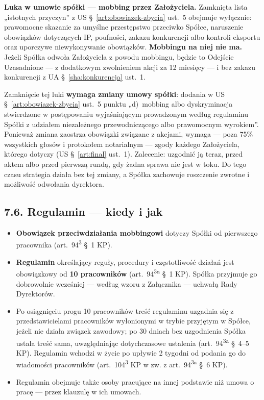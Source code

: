 \documentclass[11pt,a4paper]{report}
\newcommand{\US}[1]{US §~#1}
\newcommand{\UA}[1]{UA §~#1}
\begin{document}
\begin{Prawo}
\textbf{Luka w umowie spółki --- mobbing przez Założyciela.} Zamknięta lista „istotnych przyczyn” z \US{\ref{art:obowiazek-zbycia} ust.~5} obejmuje wyłącznie: prawomocne skazanie za umyślne przestępstwo przeciwko Spółce, naruszenie obowiązków dotyczących IP, poufności, zakazu konkurencji albo kontroli eksportu oraz uporczywe niewykonywanie obowiązków. \textbf{Mobbingu na niej nie ma.} Jeżeli Spółka odwoła Założyciela z powodu mobbingu, będzie to Odejście Uzasadnione --- z dodatkowym zwolnieniem akcji za 12 miesięcy --- i bez zakazu konkurencji z \UA{\ref{sha:konkurencja} ust.~1}.

Zamknięcie tej luki \textbf{wymaga zmiany umowy spółki}: dodania w \US{\ref{art:obowiazek-zbycia} ust.~5} punktu „d)~mobbing albo dyskryminacja stwierdzone w postępowaniu wyjaśniającym prowadzonym według regulaminu Spółki z udziałem niezależnego przewodniczącego albo prawomocnym wyrokiem”. Ponieważ zmiana zaostrza obowiązki związane z akcjami, wymaga --- poza 75\% wszystkich głosów i protokołem notarialnym --- zgody każdego Założyciela, którego dotyczy (\US{\ref{art:final} ust.~1}). Zalecenie: uzgodnić ją teraz, przed aktem albo przed pierwszą rundą, gdy żadna sprawa nie jest w toku. Do tego czasu strategia działa bez tej zmiany, a Spółka zachowuje roszczenie zwrotne i możliwość odwołania dyrektora.
\end{Prawo}

\subsection*{7.6. Regulamin --- kiedy i jak}
\begin{itemize}
  \item \textbf{Obowiązek przeciwdziałania mobbingowi} dotyczy Spółki od pierwszego pracownika (art.~94\textsuperscript{3} §~1 KP).
  \item \textbf{Regulamin} określający reguły, procedury i częstotliwość działań jest obowiązkowy od \textbf{10 pracowników} (art.~94\textsuperscript{3a} §~1 KP). Spółka przyjmuje go dobrowolnie wcześniej --- według wzoru z Załącznika --- uchwałą Rady Dyrektorów.
  \item Po osiągnięciu progu 10 pracowników treść regulaminu uzgadnia się z przedstawicielami pracowników wyłonionymi w trybie przyjętym w Spółce, jeżeli nie działa związek zawodowy; po 30 dniach bez uzgodnienia Spółka ustala treść sama, uwzględniając dotychczasowe ustalenia (art.~94\textsuperscript{3a} §~4--5 KP). Regulamin wchodzi w życie po upływie 2 tygodni od podania go do wiadomości pracowników (art.~104\textsuperscript{3} KP w zw. z art.~94\textsuperscript{3a} §~6 KP).
  \item Regulamin obejmuje także osoby pracujące na innej podstawie niż umowa o pracę --- przez klauzulę w ich umowach.
\end{itemize}
\end{document}
